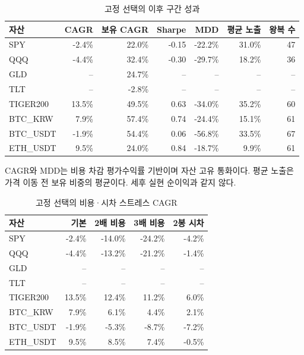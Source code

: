 \documentclass[11pt,a4paper]{article}
\begin{document}
\begin{table}[htbp]\centering
\footnotesize
\setlength{\tabcolsep}{4pt}
\caption{고정 선택의 이후 구간 성과}
\begin{tabular}{lrrrrrr}
\toprule
자산 & CAGR & 보유 CAGR & Sharpe & MDD & 평균 노출 & 왕복 수 \\
\midrule
SPY & -2.4\% & 22.0\% & -0.15 & -22.2\% & 31.0\% & 47 \\
QQQ & -4.4\% & 32.4\% & -0.30 & -29.7\% & 18.2\% & 36 \\
GLD & -- & 24.7\% & -- & -- & -- & -- \\
TLT & -- & -2.8\% & -- & -- & -- & -- \\
TIGER200 & 13.5\% & 49.5\% & 0.63 & -34.0\% & 35.2\% & 60 \\
BTC\_KRW & 7.9\% & 57.4\% & 0.74 & -24.4\% & 15.1\% & 61 \\
BTC\_USDT & -1.9\% & 54.4\% & 0.06 & -56.8\% & 33.5\% & 67 \\
ETH\_USDT & 9.5\% & 24.0\% & 0.84 & -18.7\% & 9.9\% & 61 \\
\bottomrule
\end{tabular}
\par\smallskip\begin{minipage}{\linewidth}\footnotesize CAGR와 MDD는 비용 차감 평가수익률 기반이며 자산 고유 통화이다. 평균 노출은 가격 이동 전 보유 비중의 평균이다. 세후 실현 순이익과 같지 않다.\end{minipage}
\end{table}
\begin{table}[htbp]\centering
\footnotesize
\setlength{\tabcolsep}{4pt}
\caption{고정 선택의 비용·시차 스트레스 CAGR}
\begin{tabular}{lrrrr}
\toprule
자산 & 기본 & 2배 비용 & 3배 비용 & 2봉 시차 \\
\midrule
SPY & -2.4\% & -14.0\% & -24.2\% & -4.2\% \\
QQQ & -4.4\% & -13.2\% & -21.2\% & -1.4\% \\
GLD & -- & -- & -- & -- \\
TLT & -- & -- & -- & -- \\
TIGER200 & 13.5\% & 12.4\% & 11.2\% & 6.0\% \\
BTC\_KRW & 7.9\% & 6.1\% & 4.4\% & 2.1\% \\
BTC\_USDT & -1.9\% & -5.3\% & -8.7\% & -7.2\% \\
ETH\_USDT & 9.5\% & 8.5\% & 7.4\% & -0.5\% \\
\bottomrule
\end{tabular}
\end{table}
\end{document}
